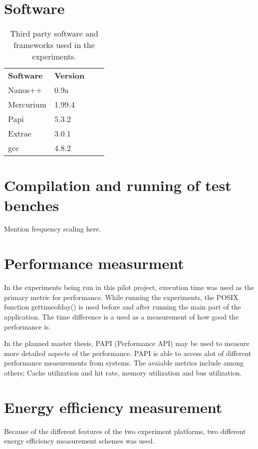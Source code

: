 
\section{Software}
\begin{table}[h]
  \begin{tabular}{llll}
    \textbf{Software} & \textbf{Version}  \\
    Nanos++           & 0.9a              \\
    Mercurium         & 1.99.4            \\
    Papi              & 5.3.2             \\
    Extrae            & 3.0.1             \\
    gcc               & 4.8.2             
  \end{tabular}
  \caption{Third party software and frameworks used in the experiments.\label{overflow}}
\end{table}


\section{Compilation and running of test benches}
Mention frequency scaling here.

\section{Performance measurment}
In the experiments being run in this pilot project, execution time was used as the primary metric for performance.
While running the experiments, the POSIX function gettimeofday() is used before and after running the main part of the application.
The time difference is a used as a measurement of how good the performance is.

In the planned master thesis, PAPI (Performance API) may be used to measure more detailed aspects of the performance.
PAPI is able to access alot of different performance measurements from systems.
The avaiable metrics include among others; Cache utilization and hit rate, memory utilization and bus utilization.

\section{Energy efficiency measurement}
Because of the different features of the two experiment platforms, two different energy efficiency measurement schemes was used.

